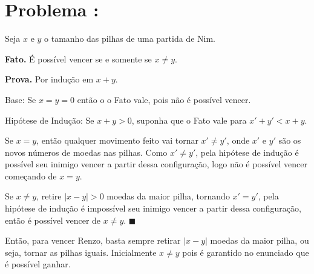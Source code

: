 \section*{Problema \proxLetra: }

Seja $x$ e $y$ o tamanho das pilhas de uma partida de Nim.

\textbf{Fato.} É possível vencer se e somente se $x \neq y$.

\textbf{Prova.} Por indução em $x + y$.

Base: Se $x = y = 0$ então o o Fato vale, pois não é possível vencer.

Hipótese de Indução: Se $x + y > 0$, suponha que o Fato vale para $x' + y' < x + y$.

Se $x = y$, então qualquer movimento feito vai tornar $x' \neq y'$, onde $x'$ e $y'$ são os novos números de moedas nas pilhas. Como $x' \neq y'$, pela hipótese de indução é possível seu inimigo vencer a partir dessa configuração, logo não é possível vencer começando de $x = y$.

Se $x \neq y$, retire $|x - y| > 0$ moedas da maior pilha, tornando $x' = y'$, pela hipótese de indução é impossível seu inimigo vencer a partir dessa configuração, então é possível vencer de $x \neq y$. $\blacksquare$


Então, para vencer Renzo, basta sempre retirar $|x - y|$ moedas da maior pilha, ou seja, tornar as pilhas iguais. Inicialmente $x \neq y$ pois é garantido no enunciado que é possível ganhar.


